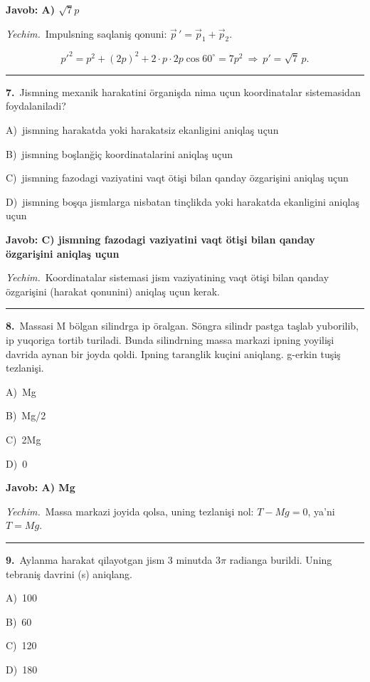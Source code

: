\documentclass[11pt,a4paper]{article}
\newcommand{\opt}[2]{\hspace*{4mm}#1)\ #2\par}
\begin{document}
\noindent\colorbox{gray!12}{\parbox{\dimexpr\linewidth-2\fboxsep}{\textbf{Javob: A) $\sqrt{7}p$}}}\par\smallskip
\noindent\textit{Yechim.}\ Impulsning saqlaniş qonuni: $\vec p\,'=\vec p_1+\vec p_2$.\par
\[p'^2=p^2+(2p)^2+2\cdot p\cdot2p\cos60^\circ=7p^2\ \Rightarrow\ p'=\sqrt7\,p.\]\par\medskip\hrule\medskip
{}\noindent\begin{minipage}{\linewidth}
\textbf{7.}\ Jismning mexanik harakatini örganişda nima uçun koordinatalar sistemasidan foydalaniladi?\par\smallskip
\opt{A}{jismning harakatda yoki harakatsiz ekanligini aniqlaş uçun}
\opt{B}{jismning boşlanğiç koordinatalarini aniqlaş uçun}
\opt{C}{jismning fazodagi vaziyatini vaqt ötişi bilan qanday özgarişini aniqlaş uçun}
\opt{D}{jismning boşqa jismlarga nisbatan tinçlikda yoki harakatda ekanligini aniqlaş uçun}
\end{minipage}\vspace{2pt}\par
\noindent\colorbox{gray!12}{\parbox{\dimexpr\linewidth-2\fboxsep}{\textbf{Javob: C) jismning fazodagi vaziyatini vaqt ötişi bilan qanday özgarişini aniqlaş uçun}}}\par\smallskip
\noindent\textit{Yechim.}\ Koordinatalar sistemasi jism vaziyatining vaqt ötişi bilan qanday özgarişini (harakat qonunini) aniqlaş uçun kerak.\par\par\medskip\hrule\medskip
{}\noindent\begin{minipage}{\linewidth}
\textbf{8.}\ Massasi M bölgan silindrga ip öralgan. Söngra silindr pastga taşlab yuborilib, ip yuqoriga tortib turiladi. Bunda silindrning massa markazi ipning yoyilişi davrida aynan bir joyda qoldi. Ipning taranglik kuçini aniqlang. g-erkin tuşiş tezlanişi.\par\smallskip
\opt{A}{Mg}
\opt{B}{Mg/2}
\opt{C}{2Mg}
\opt{D}{0}
\end{minipage}\vspace{2pt}\par
\noindent\colorbox{gray!12}{\parbox{\dimexpr\linewidth-2\fboxsep}{\textbf{Javob: A) Mg}}}\par\smallskip
\noindent\textit{Yechim.}\ Massa markazi joyida qolsa, uning tezlanişi nol: $T-Mg=0$, ya’ni $T=Mg$.\par\par\medskip\hrule\medskip
{}\noindent\begin{minipage}{\linewidth}
\textbf{9.}\ Aylanma harakat qilayotgan jism 3 minutda 3$\pi$ radianga burildi. Uning tebraniş davrini (s) aniqlang.\par\smallskip
\opt{A}{100}
\opt{B}{60}
\opt{C}{120}
\opt{D}{180}
\end{minipage}\vspace{2pt}\par
\end{document}
